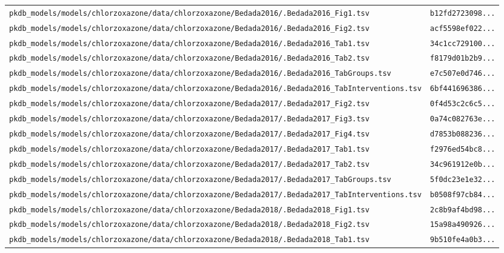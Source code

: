 \begin{longtable}{ll}
\texttt{pkdb\_models/models/chlorzoxazone/data/chlorzoxazone/Bedada2016/.Bedada2016\_Fig1.tsv} & \texttt{b12fd2723098...} \\
\texttt{pkdb\_models/models/chlorzoxazone/data/chlorzoxazone/Bedada2016/.Bedada2016\_Fig2.tsv} & \texttt{acf5598ef022...} \\
\texttt{pkdb\_models/models/chlorzoxazone/data/chlorzoxazone/Bedada2016/.Bedada2016\_Tab1.tsv} & \texttt{34c1cc729100...} \\
\texttt{pkdb\_models/models/chlorzoxazone/data/chlorzoxazone/Bedada2016/.Bedada2016\_Tab2.tsv} & \texttt{f8179d01b2b9...} \\
\texttt{pkdb\_models/models/chlorzoxazone/data/chlorzoxazone/Bedada2016/.Bedada2016\_TabGroups.tsv} & \texttt{e7c507e0d746...} \\
\texttt{pkdb\_models/models/chlorzoxazone/data/chlorzoxazone/Bedada2016/.Bedada2016\_TabInterventions.tsv} & \texttt{6bf441696386...} \\
\texttt{pkdb\_models/models/chlorzoxazone/data/chlorzoxazone/Bedada2017/.Bedada2017\_Fig2.tsv} & \texttt{0f4d53c2c6c5...} \\
\texttt{pkdb\_models/models/chlorzoxazone/data/chlorzoxazone/Bedada2017/.Bedada2017\_Fig3.tsv} & \texttt{0a74c082763e...} \\
\texttt{pkdb\_models/models/chlorzoxazone/data/chlorzoxazone/Bedada2017/.Bedada2017\_Fig4.tsv} & \texttt{d7853b088236...} \\
\texttt{pkdb\_models/models/chlorzoxazone/data/chlorzoxazone/Bedada2017/.Bedada2017\_Tab1.tsv} & \texttt{f2976ed54bc8...} \\
\texttt{pkdb\_models/models/chlorzoxazone/data/chlorzoxazone/Bedada2017/.Bedada2017\_Tab2.tsv} & \texttt{34c961912e0b...} \\
\texttt{pkdb\_models/models/chlorzoxazone/data/chlorzoxazone/Bedada2017/.Bedada2017\_TabGroups.tsv} & \texttt{5f0dc23e1e32...} \\
\texttt{pkdb\_models/models/chlorzoxazone/data/chlorzoxazone/Bedada2017/.Bedada2017\_TabInterventions.tsv} & \texttt{b0508f97cb84...} \\
\texttt{pkdb\_models/models/chlorzoxazone/data/chlorzoxazone/Bedada2018/.Bedada2018\_Fig1.tsv} & \texttt{2c8b9af4bd98...} \\
\texttt{pkdb\_models/models/chlorzoxazone/data/chlorzoxazone/Bedada2018/.Bedada2018\_Fig2.tsv} & \texttt{15a98a490926...} \\
\texttt{pkdb\_models/models/chlorzoxazone/data/chlorzoxazone/Bedada2018/.Bedada2018\_Tab1.tsv} & \texttt{9b510fe4a0b3...} \\

\end{longtable}

